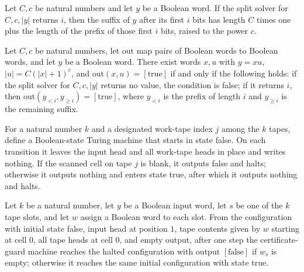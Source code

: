 \begin{theorem}
\label{Turing.certSplit_valid}
\leanok
{}
Let $C,c$ be natural numbers and let $y$ be a Boolean word. If the split solver for
$C,c,|y|$ returns $i$, then the suffix of $y$ after its first $i$ bits has length $C$
times one plus the length of the prefix of those first $i$ bits, raised to the power
$c$.
\end{theorem}

\begin{theorem}
\label{Turing.certSplit_language}
\leanok
{}
Let $C,c$ be natural numbers, let $\mathrm{out}$ map pairs of Boolean words to Boolean
words, and let $y$ be a Boolean word. There exist words $x,u$ with $y=xu$,
$|u|=C(|x|+1)^c$, and $\mathrm{out}(x,u)=[\mathrm{true}]$ if and only if the following
holds: if the split solver for $C,c,|y|$ returns no value, the condition is false; if it
returns $i$, then $\mathrm{out}(y_{<i},y_{\ge i})=[\mathrm{true}]$, where $y_{<i}$ is
the prefix of length $i$ and $y_{\ge i}$ is the remaining suffix.
\end{theorem}

\begin{definition}
\label{Turing.certGuardTM}
\leanok
{}
For a natural number $k$ and a designated work-tape index $j$ among the $k$ tapes,
define a Boolean-state Turing machine that starts in state false. On each transition it
leaves the input head and all work-tape heads in place and writes nothing. If the
scanned cell on tape $j$ is blank, it outputs false and halts; otherwise it outputs
nothing and enters state true, after which it outputs nothing and halts.
\end{definition}

\begin{theorem}
\label{Turing.certGuard_run}
\leanok
{}
Let $k$ be a natural number, let $y$ be a Boolean input word, let $s$ be one of the $k$
tape slots, and let $w$ assign a Boolean word to each slot. From the configuration with
initial state false, input head at position $1$, tape contents given by $w$ starting at
cell $0$, all tape heads at cell $0$, and empty output, after one step the
certificate-guard machine reaches the halted configuration with output
$[\mathrm{false}]$ if $w_s$ is empty; otherwise it reaches the same initial
configuration with state true.
\end{theorem}

